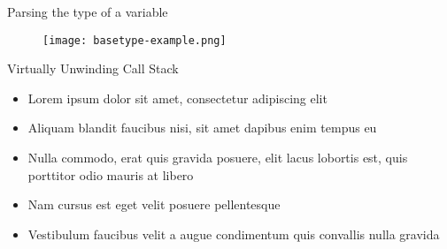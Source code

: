 \begin{frame}{Parsing the type of a variable}
	\begin{figure}
		\texttt{[image: basetype-example.png]}
	\end{figure}
\end{frame}


\begin{frame}{Virtually Unwinding Call Stack}
    \begin{itemize}
        \item Lorem ipsum dolor sit amet, consectetur adipiscing elit
        \item Aliquam blandit faucibus nisi, sit amet dapibus enim tempus eu
        \item Nulla commodo, erat quis gravida posuere, elit lacus lobortis est, quis porttitor odio mauris at libero
        \item Nam cursus est eget velit posuere pellentesque
        \item Vestibulum faucibus velit a augue condimentum quis convallis nulla gravida
    \end{itemize}
\end{frame}


